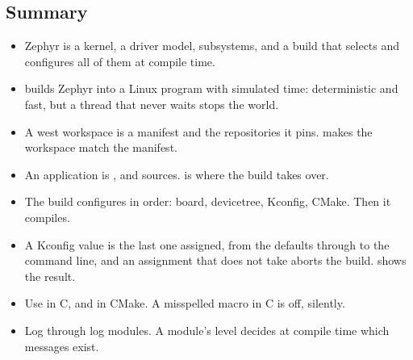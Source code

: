 \subsection{Summary}
\begin{itemize}
  \item Zephyr is a kernel, a driver model, subsystems, and a build that selects and configures all of them
    at compile time.
  \item {} builds Zephyr into a Linux program with simulated time: deterministic and fast,
    but a thread that never waits stops the world.
  \item A west workspace is a manifest and the repositories it pins.  makes the workspace
    match the manifest.
  \item An application is ,  and sources.  is
    where the build takes over.
  \item The build configures in order: board, devicetree, Kconfig, CMake. Then it compiles.
  \item A Kconfig value is the last one assigned, from the defaults through  to the command
    line, and an assignment that does not take aborts the build.  shows the
    result.
  \item Use  in C, and  in CMake. A misspelled  macro in C
    is off, silently.
  \item Log through log modules. A module’s level decides at compile time which messages exist.
\end{itemize}
